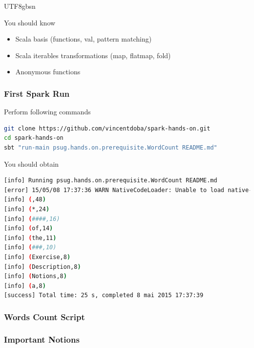 \documentclass[slidetop,9pt,utf8]{beamer}
\begin{document}
\begin{CJK}{UTF8}{gbsn}
\begin{frame}
  \begin{block}{You should know}
    \begin{itemize}
      \item Scala basis (functions, val, pattern matching)
      \item Scala iterables transformations (map, flatmap, fold)
      \item Anonymous functions
    \end{itemize}
  \end{block}

\end{frame}

\begin{frame}[fragile]
  \frametitle{First Spark Run}

  \begin{block}{Perform following commands}
    \begin{lstlisting}[language=bash, style=terminal-medium]
git clone https://github.com/vincentdoba/spark-hands-on.git
cd spark-hands-on
sbt "run-main psug.hands.on.prerequisite.WordCount README.md" 
    \end{lstlisting}
  \end{block}

  \begin{block}{You should obtain}
    \begin{lstlisting}[language=bash, style=terminal]
[info] Running psug.hands.on.prerequisite.WordCount README.md
[error] 15/05/08 17:37:36 WARN NativeCodeLoader: Unable to load native-hadoop library for your platform... using builtin-java classes where applicable
[info] (,48)
[info] (*,24)
[info] (####,16)
[info] (of,14)
[info] (the,11)
[info] (###,10)
[info] (Exercise,8)
[info] (Description,8)
[info] (Notions,8)
[info] (a,8)
[success] Total time: 25 s, completed 8 mai 2015 17:37:39
    \end{lstlisting}
  \end{block}

\end{frame}

\begin{frame}[fragile]
  \frametitle{Words Count Script}

  

\end{frame}

\begin{frame}
  \frametitle{Important Notions}


\end{frame}
\end{CJK}
\end{document}
